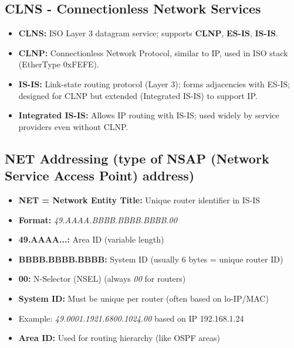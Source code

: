\begin{multicols*}{5}
		\subsection{CLNS - Connectionless Network Services}
		\begin{itemize}
			\item \textbf{CLNS:} ISO Layer 3 datagram service; supports \textbf{CLNP}, \textbf{ES-IS}, \textbf{IS-IS}.
			\item \textbf{CLNP:} Connectionless Network Protocol, similar to IP, used in ISO stack (EtherType 0xFEFE).
			\item \textbf{IS-IS:} Link-state routing protocol (Layer 3); forms adjacencies with ES-IS; designed for CLNP but extended (Integrated IS-IS) to support IP.
			\item \textbf{Integrated IS-IS:} Allows IP routing with IS-IS; used widely by service providers even without CLNP.
		\end{itemize}
		\subsection{NET Addressing (type of NSAP (Network Service Access Point) address)}
		\begin{itemize}
			\item \textbf{NET = Network Entity Title:} Unique router identifier in IS-IS
			\item \textbf{Format:} \textit{49.AAAA.BBBB.BBBB.BBBB.00}
			\item \textbf{49.AAAA...:} Area ID (variable length)
			\item \textbf{BBBB.BBBB.BBBB:} System ID (usually 6 bytes = unique router ID)
			\item \textbf{00:} N-Selector (NSEL) (always \textit{00} for routers)
			\item \textbf{System ID:} Must be unique per router (often based on lo-IP/MAC)
			\item Example: \textit{49.0001.1921.6800.1024.00} based on IP 192.168.1.24
			\item \textbf{Area ID:} Used for routing hierarchy (like OSPF areas)
		\end{itemize}

\end{multicols*}
